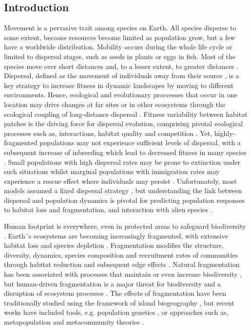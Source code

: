 \documentclass[12pt]{article}
\begin{document}
\begin{justify}
{{{{{\section{Introduction}
Movement is a pervasive trait among species on Earth. All species disperse to some extent, because resources become limited as population grow, but a few have a worldwide distribution. Mobility occurs during the whole life cycle or limited to dispersal stages, such as seeds in plants or eggs in fish. Most of the species move over short distances and, to a lesser extent, to greater distances \citep{davidson2004quantifying}. Dispersal, defined as the movement of individuals away from their source \citep{nathan2003methods}, is a key strategy to increase fitness in dynamic landscapes by moving to different environments. Hence, ecological and evolutionary proccesses that occur in one location may drive changes at far sites or in other ecosystems through the ecological coupling of long-distance dispersal \citep{gaines2007connecting}. Fitness variability between habitat patches is the driving force for dispersal evolution, comprising pivotal ecological processes such as, interactions, habitat quality and competition \citep{bowler2005causes}. Yet, highly-fragmented populations may not experience sufficient levels of dispersal, with a subsequent increase of inbreeding which lead to decreased fitness in many species \citep{fath2018encyclopedia}. Small populations with high dispersal rates may be prone to extinction under such situations  whilst marginal populations with immigration rates may experience a rescue effect where individuals may persist \citep{eriksson2014emergence}. Unfortunately, most models assumed a fixed dispersal strategy \citep{mccallum2001should, levin2003ecology}, but understanding the link between dispersal and population dynamics is pivotal for predicting population responses to habitat loss and fragmentation, and interaction with alien species \citep{bowler2005causes}.

Human footprint is everywhere, even in protected areas to safeguard biodiversity \citep{ tournadre2014anthropogenic, jones2018one}. Earth´s ecosystems are becoming increasingly fragmented, with extensive habitat loss and species depletion \citep{haddad2015habitat}. Fragmentation modifies the structure, diversity, dynamics, species composition and recruitment rates of communities through habitat reduction and subsequent edge effects \citep{laurance1998effects, short2011extinction}. Natural fragmentation has been associated with processes that maintain or even increase biodiversity \citep{tilman1988plant}, but human-driven fragmentation is a major threat for biodiversity \citep{pimm2000biodiversity} and a disruption of ecosystem processes \citep{achard2002determination}. The effects of fragmentation have been traditionally studied using the framework of island biogeography \citep{whittaker2007island}, but recent works have included tools, e.g. population genetics \citep{young1996population}, or approaches such as, metapopulation \citep{hanski2004ecology} and metacommunity theories \citep{mouquet2011extinction}.

}}}}}
\end{justify}
\end{document}
